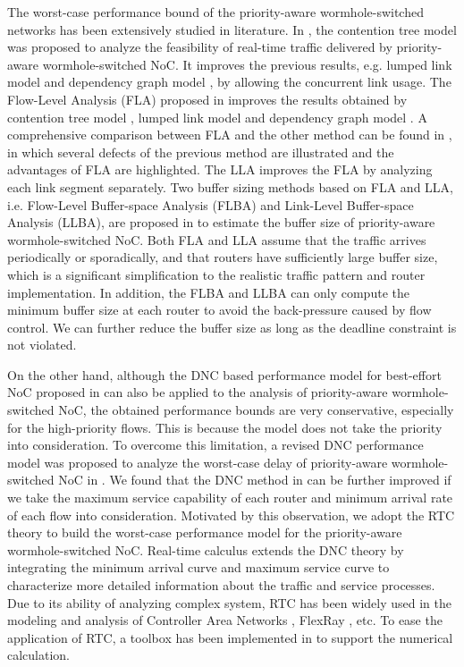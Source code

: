 \documentclass[preprint]{elsarticle}
\begin{document}
The worst-case performance bound of the priority-aware wormhole-switched networks has been extensively studied in literature. In \cite{LuJS05}, the contention tree model was proposed to analyze the feasibility of real-time traffic delivered by priority-aware wormhole-switched NoC. It improves the previous results, e.g. lumped link model \cite{707545} and dependency graph model \cite{708526}, by allowing the concurrent link usage. The Flow-Level Analysis (FLA) proposed in \cite{Shi:2008:RCA:1397757.1397996} improves the results obtained by contention tree model \cite{LuJS05}, lumped link model \cite{707545} and dependency graph model \cite{708526}. A comprehensive comparison between FLA and the other method can be found in \cite{Shi2009}, in which several defects of the previous method are illustrated and the advantages of FLA are highlighted. The LLA \cite{73} improves the FLA by analyzing each link segment separately. Two buffer sizing methods based on FLA and LLA, i.e. Flow-Level Buffer-space Analysis (FLBA) and Link-Level Buffer-space Analysis (LLBA), are proposed in \cite{189} to estimate the buffer size of priority-aware wormhole-switched NoC. Both FLA and LLA assume that the traffic arrives periodically or sporadically, and that routers have sufficiently large buffer size, which is a significant simplification to the realistic traffic pattern and router implementation. In addition, the FLBA and LLBA can only compute the minimum buffer size at each router to avoid the back-pressure caused by flow control. We can further reduce the buffer size as long as the deadline constraint is not violated.

On the other hand, although the DNC based performance model for best-effort NoC proposed in \cite{qian2009analysis} can also be applied to the analysis of priority-aware wormhole-switched NoC, the obtained performance bounds are very conservative, especially for the high-priority flows. This is because the model does not take the priority into consideration. To overcome this limitation, a revised DNC performance model was proposed to analyze the worst-case delay of priority-aware wormhole-switched NoC in \cite{Qian489900}. We found that the DNC method in \cite{Qian489900} can be further improved if we take the maximum service capability of each router and minimum arrival rate of each flow into consideration. Motivated by this observation, we adopt the RTC theory \cite{1253607} to build the worst-case performance model for the priority-aware wormhole-switched NoC. Real-time calculus extends the DNC theory \cite{Boudec2001Network} by integrating the minimum arrival curve and maximum service curve to characterize more detailed information about the traffic and service processes. Due to its ability of analyzing complex system, RTC has been widely used in the modeling and analysis of Controller Area Networks \cite{4617308}, FlexRay \cite{Hagiescu:2007:PAF:1278480.1278554}, etc. To ease the application of RTC, a toolbox has been implemented in \cite{rtc} to support the numerical calculation.
\end{document}
